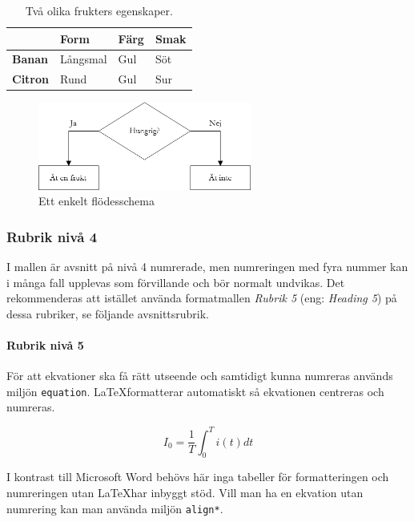 \documentclass[12pt]{report}
\begin{document}
\begin{table}[ht!]
    \label{tab:fruits}
    \centering
    \caption{Två olika frukters egenskaper.}
    \begin{tabular}{|l|l|l|l|}
        \hline
        & \textbf{Form} & \textbf{Färg} & \textbf{Smak} \\
        \hline
        \textbf{Banan} & Långsmal & Gul & Söt \\
        \hline
        \textbf{Citron} & Rund & Gul & Sur \\
        \hline
    \end{tabular}
\end{table}

\begin{figure}[ht!]
    \label{fig:flowchart}
    \centering
    \includegraphics[width=7cm]{images/flowchart}
    \caption{Ett enkelt flödesschema}
\end{figure}

\subsubsection{Rubrik nivå 4}
I mallen är avsnitt på nivå 4 numrerade, men numreringen med fyra nummer
kan i många fall upplevas som förvillande och bör normalt undvikas. Det
rekommenderas att istället använda formatmallen \textit{Rubrik 5} (eng:
\textit{Heading 5}) på dessa rubriker, se följande avsnittsrubrik. 

\paragraph{Rubrik nivå 5}
För att ekvationer ska få rätt utseende och samtidigt kunna numreras används
miljön \verb|equation|. \LaTeX formatterar automatiskt så ekvationen
centreras och numreras. 

\begin{equation}
    \label{eq:integral}
    I_0 = \frac{1}{T}\int_0^T i(t)dt
\end{equation}

I kontrast till Microsoft Word behövs här inga tabeller för formatteringen
och numreringen utan \LaTeX har inbyggt stöd. Vill man ha en ekvation
utan numrering kan man använda miljön \verb|align*|. 
\end{document}

